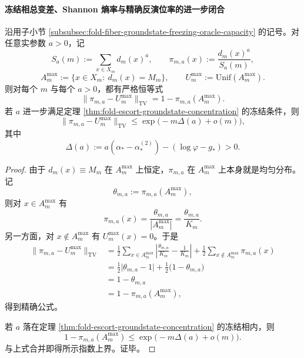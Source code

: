 \paragraph{冻结相总变差、Shannon 熵率与精确反演位率的进一步闭合}

\begin{theorem}\label{thm:fold-escort-groundstate-tv-exact}
沿用子小节 \ref{subsubsec:fold-fiber-groundstate-freezing-oracle-capacity} 的记号。对任意实参数 \(a>0\)，记
\[
S_a(m):=\sum_{x\in X_m}d_m(x)^a,
\qquad
\pi_{m,a}(x):=\frac{d_m(x)^a}{S_a(m)},
\]
\[
A_m^{\max}:=\{x\in X_m:\ d_m(x)=M_m\},
\qquad
U_m^{\max}:=\mathrm{Unif}(A_m^{\max}).
\]
则对每个 \(m\) 与每个 \(a>0\)，都有严格恒等式
\[
\boxed{\;
\|\pi_{m,a}-U_m^{\max}\|_{\mathrm{TV}}
=
1-\pi_{m,a}(A_m^{\max}).\;}
\]
若 \(a\) 进一步满足定理 \ref{thm:fold-escort-groundstate-concentration} 的冻结条件，则
\[
\boxed{\;
\|\pi_{m,a}-U_m^{\max}\|_{\mathrm{TV}}
\le
\exp\!\bigl(-m\Delta(a)+o(m)\bigr),\;}
\]
其中
\[
\Delta(a):=a(\alpha_*-\alpha_*^{(2)})-(\log\varphi-g_*)>0.
\]
\end{theorem}
\begin{proof}
由于 \(d_m(x)\equiv M_m\) 在 \(A_m^{\max}\) 上恒定，\(\pi_{m,a}\) 在 \(A_m^{\max}\) 上本身就是均匀分布。记
\[
\theta_{m,a}:=\pi_{m,a}(A_m^{\max}),
\]
则对 \(x\in A_m^{\max}\) 有
\[
\pi_{m,a}(x)=\frac{\theta_{m,a}}{|A_m^{\max}|}
=\frac{\theta_{m,a}}{K_m}.
\]
另一方面，对 \(x\notin A_m^{\max}\) 有 \(U_m^{\max}(x)=0\)。于是
\[
\begin{aligned}
\|\pi_{m,a}-U_m^{\max}\|_{\mathrm{TV}}
&=
\frac12\sum_{x\in A_m^{\max}}
\left|\frac{\theta_{m,a}}{K_m}-\frac{1}{K_m}\right|
+\frac12\sum_{x\notin A_m^{\max}}\pi_{m,a}(x)\\
&=
\frac12\bigl|\theta_{m,a}-1\bigr|
+\frac12\bigl(1-\theta_{m,a}\bigr)\\
&=
1-\theta_{m,a}\\
&=
1-\pi_{m,a}(A_m^{\max}),
\end{aligned}
\]
得到精确公式。

若 \(a\) 落在定理 \ref{thm:fold-escort-groundstate-concentration} 的冻结相内，则
\[
1-\pi_{m,a}(A_m^{\max})
\le
\exp\!\bigl(-m\Delta(a)+o(m)\bigr).
\]
与上式合并即得所示指数上界。证毕。
\end{proof}

